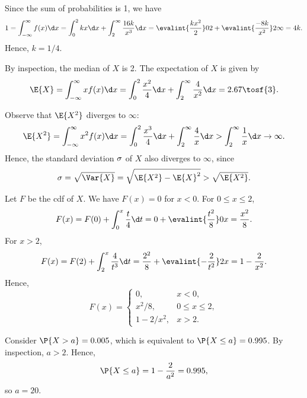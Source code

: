 \begin{solution}
    Since the sum of probabilities is 1, we have \[1 = \int_{-\infty}^\infty f(x) \d x = \int_0^2 kx \d x + \int_2^\infty \frac{16k}{x^3} \d x = \evalint{\frac{kx^2}2}02 + \evalint{\frac{-8k}{x^{2}}}2\infty = 4k.\] Hence, $k = 1/4$.

    By inspection, the median of $X$ is 2. The expectation of $X$ is given by \[\E{X} = \int_{-\infty}^\infty x f(x) \d x = \int_0^2 \frac{x^2}4 \d x + \int_2^\infty \frac{4}{x^2} \d x = 2.67 \tosf{3}.\]

    Observe that $\E{X^2}$ diverges to $\infty$: \[\E{X^2} = \int_{-\infty}^\infty x^2 f(x) \d x = \int_0^2 \frac{x^3}4 \d x + \int_2^\infty \frac{4}{x} \d x > \int_2^\infty \frac{1}{x} \d x \to \infty.\] Hence, the standard deviation $\sigma$ of $X$ also diverges to $\infty$, since \[\s = \sqrt{\Var{X}} = \sqrt{\E{X^2} - \E{X}^2} > \sqrt{\E{X^2}}.\]

    Let $F$ be the cdf of $X$. We have $F(x) = 0$ for $x < 0$. For $0 \leq x \leq 2$, \[F(x) = F(0) + \int_0^x \frac{t}{4} \d t = 0 + \evalint{\frac{t^2}{8}}0x = \frac{x^2}{8}.\] For $x > 2$, \[F(x) = F(2) + \int_2^x \frac4{t^3} \d t = \frac{2^2}{8} + \evalint{-\frac{2}{t^2}}2x = 1 - \frac2{x^2}.\] Hence, \[F(x) = \begin{cases}
        0, & x < 0,\\
        x^2/8, & 0 \leq x \leq 2,\\
        1 - 2/x^2, & x > 2.
    \end{cases}\]
    
    \begin{figure}[H]
    \centering
    \end{figure}
    
    Consider $\P{X > a} = 0.005$, which is equivalent to $\P{X \leq a} = 0.995$. By inspection, $a > 2$. Hence, \[\P{X \leq a} = 1 - \frac{2}{a^2} = 0.995,\] so $a = 20$.
\end{solution}

